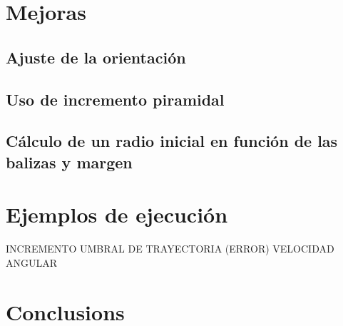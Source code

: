 
\section{Mejoras}

\subsection{Ajuste de la orientación}
\subsection{Uso de incremento piramidal}
\subsection{Cálculo de un radio inicial en función de las balizas y margen}

\section{Ejemplos de ejecución}

INCREMENTO 
UMBRAL DE TRAYECTORIA (ERROR)
VELOCIDAD ANGULAR

\section{Conclusions}

